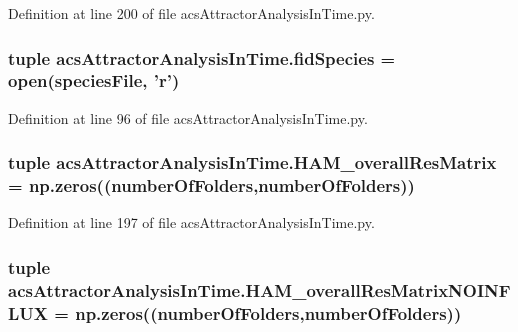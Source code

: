 Definition at line 200 of file acs\-Attractor\-Analysis\-In\-Time.\-py.

\hypertarget{a00123_a70d70b9ab98e722475b03465c7f8dbbe}{
\subsubsection[{fid\-Species}]{\setlength{\rightskip}{0pt plus 5cm}tuple acs\-Attractor\-Analysis\-In\-Time.\-fid\-Species = open({\bf species\-File}, '{\bf r}')}}\label{a00123_a70d70b9ab98e722475b03465c7f8dbbe}


Definition at line 96 of file acs\-Attractor\-Analysis\-In\-Time.\-py.

\hypertarget{a00123_a5e8d5d65865736555e76c3f04058ddd9}{
\subsubsection[{H\-A\-M\-\_\-overall\-Res\-Matrix}]{\setlength{\rightskip}{0pt plus 5cm}tuple acs\-Attractor\-Analysis\-In\-Time.\-H\-A\-M\-\_\-overall\-Res\-Matrix = np.\-zeros(({\bf number\-Of\-Folders},{\bf number\-Of\-Folders}))}}\label{a00123_a5e8d5d65865736555e76c3f04058ddd9}


Definition at line 197 of file acs\-Attractor\-Analysis\-In\-Time.\-py.

\hypertarget{a00123_a6ea74abf4c94200ed1b27d892ecacc97}{
\subsubsection[{H\-A\-M\-\_\-overall\-Res\-Matrix\-N\-O\-I\-N\-F\-L\-U\-X}]{\setlength{\rightskip}{0pt plus 5cm}tuple acs\-Attractor\-Analysis\-In\-Time.\-H\-A\-M\-\_\-overall\-Res\-Matrix\-N\-O\-I\-N\-F\-L\-U\-X = np.\-zeros(({\bf number\-Of\-Folders},{\bf number\-Of\-Folders}))}}\label{a00123_a6ea74abf4c94200ed1b27d892ecacc97}


